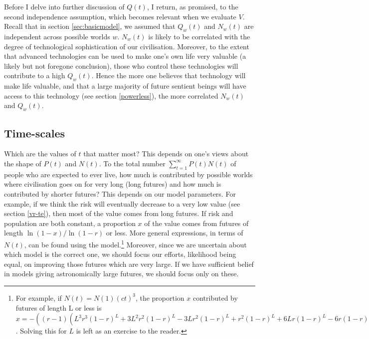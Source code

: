\documentclass[british]{article}
\begin{document}
Before I delve into further discussion of $Q(t)$, I return, as promised, to the second independence assumption, which becomes relevant when we evaluate $V$. Recall that in section \ref{sec:basicmodel}, we assumed that $Q_w(t)$ and $N_w(t)$ are independent across possible worlds $w$. $N_w(t)$ is likely to be correlated with the degree of technological sophistication of our civilisation. Moreover, to the extent that advanced technologies can be used to make one's own life very valuable (a likely but not foregone conclusion), those who control these technologies will contribute to a high $Q_w(t)$. Hence the more one believes that technology will make life valuable, and that a large majority of future sentient beings will have access to this technology (see section \ref{powerless}), the more correlated $N_w(t)$ and $Q_w(t)$.

\subsection{Time-scales}\label{section:time-scales}
Which are the values of $t$ that matter most? This depends on one's views about the shape of $P(t)$ and $N(t)$. To the total number $\sum_{t=1}^\infty P(t)N(t)$ of people who are expected to ever live, how much is contributed by possible worlds where civilisation goes on for very long (long futures) and how much is contributed by shorter futures? This depends on our model parameters. For example, if we think the risk will eventually decrease to a very low value (see section \ref{vr-te}), then most of the value comes from long futures. If risk and population are both constant, a proportion $x$ of the value comes from futures of length $\ln(1-x)/\ln(1-r)$ or less. More general expressions, in terms of $N(t)$, can be found using the model.\footnote{For example, if $N(t)=N(1)(ct)^3$, the proportion $x$ contributed by futures of length L or less is $x=-((r - 1) (L^3 r^3 (1 - r)^L + 3 L^2 r^2 (1 - r)^L - 3 L r^2 (1 - r)^L + r^2 (1 - r)^L + 6 L r (1 - r)^L - 6 r (1 - r)^L + 6 (1 - r)^L - r^2 + 6 r - 6))\frac{1}{r^3 - 7 r^2 + 12 r - 6}$. Solving this for $L$ is left as an exercise to the reader.} Moreover, since we are uncertain about which model is the correct one, we should focus our efforts, likelihood being equal, on improving those futures which are very large. If we have sufficient belief in models giving astronomically large futures, we should focus only on these.
\end{document}
